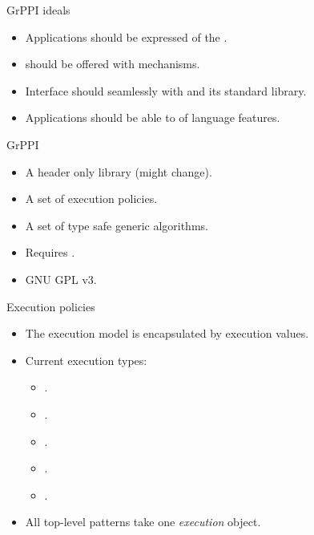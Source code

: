 \begin{frame}[t]{GrPPI ideals}
\begin{itemize}[<+->]
  \item Applications should be expressed  of the
        .
  \vfill
  \item {} should be offered with 
        mechanisms.
  \vfill
  \item Interface should  seamlessly with  and
        its standard library.
  \vfill
  \item Applications should be able to  of  language features.
\end{itemize}
\end{frame}

\begin{frame}[t]{GrPPI}
\begin{Large}
\end{Large}
\vfill\pause
\begin{itemize}
  \item A header only library (might change).
  \item A set of execution policies.
  \item A set of type safe generic algorithms.
  \item Requires .
  \item GNU GPL v3.
\end{itemize}
\end{frame}

\begin{frame}[t]{Execution policies}
\begin{itemize}
  \item The execution model is encapsulated by execution values.
  \vfill
  \item Current execution types:
    \begin{itemize}
      \item {}.
      \item {}.
      \item {}.
      \item {}.
      \item {}.
    \end{itemize}
  \vfill
  \item All top-level patterns take one \emph{execution} object.
\end{itemize}
\end{frame}


